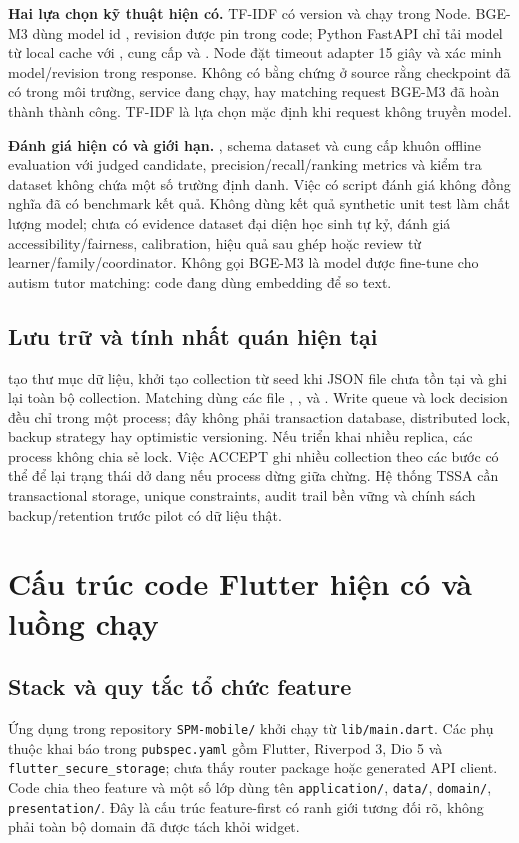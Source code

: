 \documentclass[11pt,a4paper]{article}
\begin{document}
\textbf{Hai lựa chọn kỹ thuật hiện có.} TF-IDF có version  và chạy trong Node. BGE-M3 dùng model id , revision được pin trong code; Python FastAPI chỉ tải model từ local cache với , cung cấp  và . Node đặt timeout adapter 15 giây và xác minh model/revision trong response. Không có bằng chứng ở source rằng checkpoint đã có trong môi trường, service đang chạy, hay matching request BGE-M3 đã hoàn thành thành công. TF-IDF là lựa chọn mặc định khi request không truyền model.

\textbf{Đánh giá hiện có và giới hạn.} , schema dataset và  cung cấp khuôn offline evaluation với judged candidate, precision/recall/ranking metrics và kiểm tra dataset không chứa một số trường định danh. Việc có script đánh giá không đồng nghĩa đã có benchmark kết quả. Không dùng kết quả synthetic unit test làm chất lượng model; chưa có evidence dataset đại diện học sinh tự kỷ, đánh giá accessibility/fairness, calibration, hiệu quả sau ghép hoặc review từ learner/family/coordinator. Không gọi BGE-M3 là model được fine-tune cho autism tutor matching: code đang dùng embedding để so text.

\subsection{Lưu trữ và tính nhất quán hiện tại}
 tạo thư mục dữ liệu, khởi tạo collection từ seed khi JSON file chưa tồn tại và ghi lại toàn bộ collection. Matching dùng các file , ,  và . Write queue và lock decision đều chỉ trong một process; đây không phải transaction database, distributed lock, backup strategy hay optimistic versioning. Nếu triển khai nhiều replica, các process không chia sẻ lock. Việc ACCEPT ghi nhiều collection theo các bước có thể để lại trạng thái dở dang nếu process dừng giữa chừng. Hệ thống TSSA cần transactional storage, unique constraints, audit trail bền vững và chính sách backup/retention trước pilot có dữ liệu thật.

\section{Cấu trúc code Flutter hiện có và luồng chạy}

\subsection{Stack và quy tắc tổ chức feature}
Ứng dụng trong repository \texttt{SPM-mobile/} khởi chạy từ \texttt{lib/main.dart}. Các phụ thuộc khai báo trong \texttt{pubspec.yaml} gồm Flutter, Riverpod 3, Dio 5 và \texttt{flutter\_secure\_storage}; chưa thấy router package hoặc generated API client. Code chia theo feature và một số lớp dùng tên \texttt{application/}, \texttt{data/}, \texttt{domain/}, \texttt{presentation/}. Đây là cấu trúc feature-first có ranh giới tương đối rõ, không phải toàn bộ domain đã được tách khỏi widget.
\end{document}
